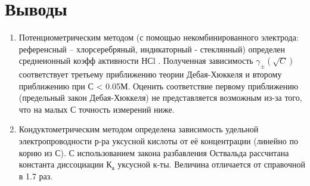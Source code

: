 \documentclass[a4paper, 12pt]{article}
\begin{document}
 \section{Выводы}
\begin{enumerate}
    \item Потенциометрическим методом (с помощью некомбинированного электрода: референсный – хлорсеребряный, индикаторный - стеклянный) определен среднеионный коэфф активности НСl . Полученная зависимость $\gamma_{\pm}(\sqrt{C})$ соответствует третьему приближению теории Дебая-Хюккеля и второму приближению  при С < 0.05М. Оценить соответствие первому приближению (предельный закон Дебая-Хюккеля) не представляется возможным из-за того, что на малых С точность измерений ниже. 
    \item Кондуктометрическим методом определена зависимость удельной электропроводности р-ра уксусной кислоты от её концентрации (линейно по корню из С). С использованием закона разбавления Оствальда рассчитана константа диссоциации $К_{а}$ уксусной к-ты. Величина отличается от справочной в 1.7 раз.

\end{enumerate}
\end{document}
